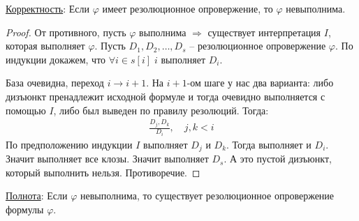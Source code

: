 \underline{Корректность}:
Если $\varphi$ имеет резолюционное опровержение, то $\varphi$ невыполнима.
\begin{proof}
    От противного, пусть $\varphi$ выполнима $\Longrightarrow$ существует интерпретация $I$, которая выполняет $\varphi$. Пусть $D_1, D_2, \dots, D_s$ -- резолюционное
    опровержение $\varphi$. По индукции докажем, что $\forall i \in s[i] \; i$ выполняет $D_i$. 

    База очевидна, переход $i \to i + 1$. На $i+1$-ом шаге у нас два варианта: либо дизъюнкт пренадлежит исходной формуле и тогда очевидно выполняется с помощью $I$, либо был выведен по правилу резолюций. 
    Тогда: 
    \begin{gather*}
        \frac{D_j, D_k}{D_i}, \quad j, k  < i
    \end{gather*}
    По предположению индукции $I$ выполняет $D_j$ и $D_k$. Тогда выполняет и $D_i$. Значит выполняет все клозы. Значит выполняет $D_s$. А это пустой дизъюнкт, который выполнить нельзя. Противоречие. 
\end{proof}
\underline{Полнота}: Если $\varphi$ невыполнима, то существует резолюционное опровержение формулы $\varphi$.

